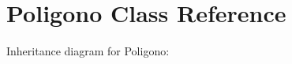 \hypertarget{classPoligono}{}\section{Poligono Class Reference}
\label{classPoligono}


Inheritance diagram for Poligono\+:
